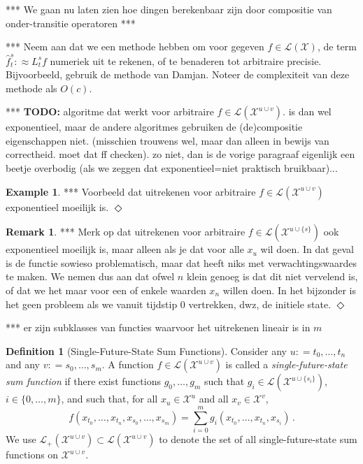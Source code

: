 \documentclass[10pt]{paper}
\theoremstyle{definition}
\newtheorem{exmp}{Example}%
\newtheorem{definition}{Definition}
\newtheorem*{remark*}{Remark}
\newcommand{\states}{\mathcal{X}}
\newcommand{\gambles}{\mathcal{L}}
\newcommand{\gamblesX}{\gambles(\states)}
\newcommand{\coloneqq}{:\!=}
\newcommand{\exampleend}{\hfill$\Diamond$}
\begin{document}
*** We gaan nu laten zien hoe dingen berekenbaar zijn door compositie van onder-transitie operatoren ***

*** Neem aan dat we een methode hebben om voor gegeven $f\in\gamblesX$, de term $\hat{f}_t^s :\approx L_t^sf$ numeriek uit te rekenen, of te benaderen tot arbitraire precisie. Bijvoorbeeld, gebruik de methode van Damjan. Noteer de complexiteit van deze methode als $O(c)$.

*** {\bf TODO:} algoritme dat werkt voor arbitraire $f\in\gambles(\states^{u\cup v})$. is dan wel exponentieel, maar de andere algoritmes gebruiken de (de)compositie eigenschappen niet. (misschien trouwens wel, maar dan alleen in bewijs van correctheid. moet dat ff checken). zo niet, dan is de vorige paragraaf eigenlijk een beetje overbodig (als we zeggen dat exponentieel=niet praktisch bruikbaar)...

\begin{exmp}
*** Voorbeeld dat uitrekenen voor arbitraire $f\in\gambles(\states^{u\cup v})$ exponentieel moeilijk is. \exampleend
\end{exmp}

\begin{remark*}
*** Merk op dat uitrekenen voor arbitraire $f\in\gambles(\states^{u\cup \{s\}})$ ook exponentieel moeilijk is, maar alleen als je dat voor alle $x_u$ wil doen. In dat geval is de functie sowieso problematisch, maar dat heeft niks met verwachtingswaardes te maken. We nemen dus aan dat ofwel $n$ klein genoeg is dat dit niet vervelend is, of dat we het maar voor een of enkele waarden $x_n$ willen doen. In het bijzonder is het geen probleem als we vanuit tijdstip 0 vertrekken, dwz, de initiele state. \exampleend
\end{remark*}

*** er zijn subklasses van functies waarvoor het uitrekenen lineair is in $m$

\begin{definition}[Single-Future-State Sum Functions]
Consider any $u\coloneqq t_0,\ldots,t_n$ and any $v\coloneqq s_0,\ldots,s_m$. A function $f\in\gambles(\states^{u\cup v})$ is called a \emph{single-future-state sum function} if there exist functions $g_0,\ldots,g_m$ such that $g_i\in\gambles(\states^{u\cup\{s_i\}})$, $i\in\{0,\ldots,m\}$, and such that, for all $x_u\in\states^u$ and all $x_v\in\states^v$,
\begin{equation*}
f(x_{t_0},\ldots,x_{t_n},x_{s_0},\ldots,x_{s_m}) = \sum_{i=0}^m g_i(x_{t_0},\ldots,x_{t_n},x_{s_i})\,.
\end{equation*}
We use $\gambles_+(\states^{u\cup v})\subset\gambles(\states^{u\cup v})$ to denote the set of all single-future-state sum functions on $\states^{u\cup v}$.
\end{definition}
\end{document}
